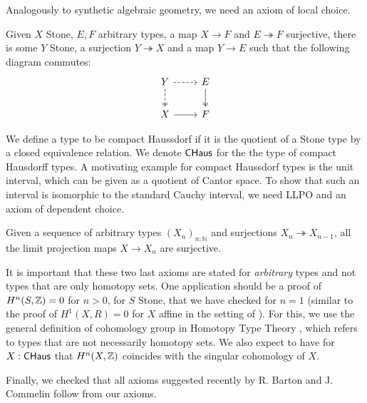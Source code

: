 \documentclass{../util/zariski}
\begin{document}
\medskip

Analogously to synthetic algebraic geometry, we need an axiom of local choice. 
\begin{axiom}
  Given $X$ Stone, $E,F$ arbitrary types, a map $X \to F$ and $E\twoheadrightarrow F$ surjective, 
  there is some $Y$ Stone,
    a surjection $Y \twoheadrightarrow X$ and a map $Y\to E$ such that the following diagram commutes:
    \begin{equation*}\begin{tikzcd}
      Y \arrow [d, two heads,dashed] \arrow [r,dashed] & E \arrow[d,""',two heads]\\
      X \arrow[r] & F
    \end{tikzcd}\end{equation*}  
\end{axiom} 

We define a type to be compact Haussdorf if it is the quotient of a Stone type by a closed equivalence relation. 
We denote $\mathsf{CHaus}$ for the the type of compact Hausdorff types. 
A motivating example for compact Haussdorf types is the unit interval, which can be given as a quotient of Cantor space. 
To show that such an interval is isomorphic to the standard Cauchy interval, 
we need LLPO and an axiom of dependent choice. 
\begin{axiom}
  Given a sequence of arbitrary types $(X_n)_{n:\mathbb N}$ and surjections $X_n \twoheadrightarrow X_{n-1}$, 
  all the limit projection maps $X \to X_n$ are surjective. 
\end{axiom}


It is important that these two last axioms are stated for {\em arbitrary} types and not types that are only
homotopy sets. One application should be a proof of $H^n(S,\mathbb{Z}) = 0$ for $n>0$, for $S$ Stone,
that we have checked for $n = 1$ (similar to the proof of $H^1(X,R) = 0$ for $X$ affine in the setting of \cite{draft}).
For this, we use the general definition of cohomology group in Homotopy Type Theory \cite{hott}, which refers to
types that are not necessarily homotopy sets.
We also expect to have for $X:\mathsf{CHaus}$ that $H^n(X,\mathbb{Z})$ coincides with the singular cohomology of $X$.

 Finally, we checked that all axioms suggested recently by R. Barton and J. Commelin \cite{bc24} follow from our axioms.





\printbibliography
\end{document}
